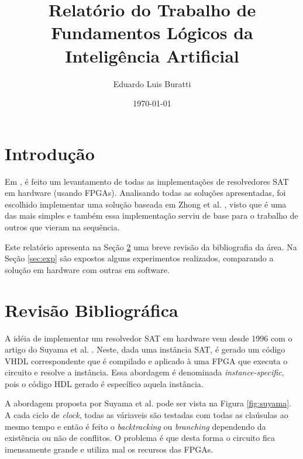 \documentclass[12pt,a4paper]{article}
\begin{document}
\title{Relatório do Trabalho de Fundamentos Lógicos da Inteligência Artificial}
\author{Eduardo Luis Buratti}
\date{\today}

\maketitle

\section{Introdução}

Em \cite{skliarova2004reconfigurablehardware}, é feito um levantamento de todas as implementações de resolvedores SAT em hardware (usando FPGAs). Analisando todas as soluções apresentadas, foi escolhido implementar uma solução baseada em Zhong et al. \cite{zhong1998usingreconfigurable}, visto que é uma das mais simples e também essa implementação serviu de base para o trabalho de outros que vieram na sequência.

Este relatório apresenta na Seção \ref{sec:rev} uma breve revisão da bibliografia da área. Na Seção \ref{sec:exp} são expostos alguns experimentos realizados, comparando a solução em hardware com outras em software.

\section{Revisão Bibliográfica}
\label{sec:rev}

A idéia de implementar um resolvedor SAT em hardware vem desde 1996 com o artigo do Suyama et al. \cite{suyama1996solvingsatisfiability}. Neste, dada uma instância SAT, é gerado um código VHDL correspondente que é compilado e aplicado à uma FPGA que executa o circuito e resolve a instância. Essa abordagem é denominada \textit{instance-specific}, pois o código HDL gerado é específico aquela instância.

A abordagem proposta por Suyama et al. \cite{suyama1996solvingsatisfiability} pode ser vista na Figura \ref{fig:suyama}. A cada ciclo de \textit{clock}, todas as váriaveis são testadas com todas as claúsulas ao mesmo tempo e então é feito o \textit{backtracking} ou \textit{branching} dependendo da existência ou não de conflitos. O problema é que desta forma o circuito fica imensamente grande e utiliza mal os recursos das FPGAs.
\end{document}
